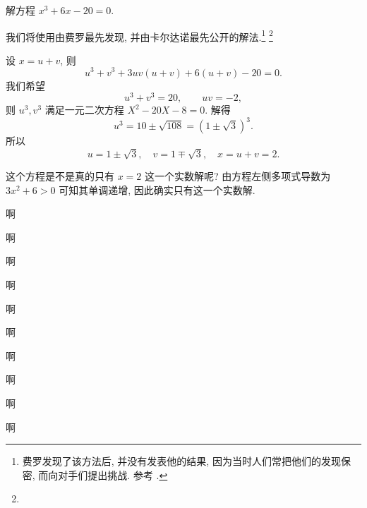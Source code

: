 \documentclass[11pt,a4paper,twoside,openright,scheme=chinese,no-math]{ctexbook}
\begin{document}
\begin{example}
  解方程 $x^3+6x-20=0$.
\end{example}

\newpage 

我们将使用由费罗最先发现, 并由卡尔达诺最先公开的解法.\footnote{%
  费罗发现了该方法后, 并没有发表他的结果, 因为当时人们常把他们的发现保密, 而向对手们提出挑战. 参考 \cite[第13章4节]{Kline1990}.
}
\footnote{}





\begin{solution}
  设 $x=u+v$, 则
  \[
    u^3+v^3+3uv(u+v)+6(u+v)-20=0.
  \]
  我们希望
  \[
    u^3+v^3=20,\qquad uv=-2,
  \]
  则 $u^3,v^3$ 满足一元二次方程 $X^2-20X-8=0$.
  解得
  \[
    u^3=10\pm\sqrt{108}=(1\pm\sqrt3)^3.
  \]
  所以
  \[
    u=1\pm\sqrt3,\quad v=1\mp\sqrt 3,\quad x=u+v=2.
  \]
\end{solution}

这个方程是不是真的只有 $x=2$ 这一个实数解呢?
由方程左侧多项式导数为 $3x^2+6>0$ 可知其单调递增, 因此确实只有这一个实数解.

啊

啊

啊

啊

啊

啊

啊

啊

啊

啊
\end{document}
